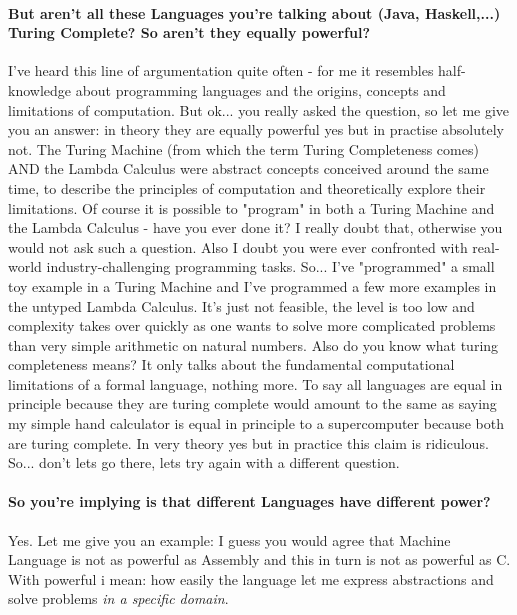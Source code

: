 \paragraph{But aren't all these Languages you're talking about (Java, Haskell,...) Turing Complete? So aren't they equally powerful?}
I've heard this line of argumentation quite often - for me it resembles half-knowledge about programming languages and the origins, concepts and limitations of computation. But ok... you really asked the question, so let me give you an answer: in theory they are equally powerful yes but in practise absolutely not.
The Turing Machine (from which the term Turing Completeness comes) AND the Lambda Calculus were abstract concepts conceived around the same time, to describe the principles of computation and theoretically explore their limitations. Of course it is possible to "program" in both a Turing Machine and the Lambda Calculus - have you ever done it? I really doubt that, otherwise you would not ask such a question. Also I doubt you were ever confronted with real-world industry-challenging programming tasks. So... I've "programmed" a small toy example in a Turing Machine and I've programmed a few more examples in the untyped Lambda Calculus. It's just not feasible, the level is too low and complexity takes over quickly as one wants to solve more complicated problems than very simple arithmetic on natural numbers.
Also do you know what turing completeness means? It only talks about the fundamental computational limitations of a formal language, nothing more. To say all languages are equal in principle because they are turing complete would amount to the same as saying my simple hand calculator is equal in principle to a supercomputer because both are turing complete. In very theory yes but in practice this claim is ridiculous. So... don't lets go there, lets try again with a different question.

\paragraph{So you're implying is that different Languages have different power?}
Yes. Let me give you an example: I guess you would agree that Machine Language is not as powerful as Assembly and this in turn is not as powerful as C.
With powerful i mean: how easily the language let me express abstractions and solve problems \textit{in a specific domain}. 


